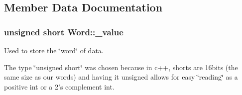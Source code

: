 \subsection{Member Data Documentation}
\hypertarget{classWord_a8b0aa1f2042266f307c51b3bdafa9128}{
\subsubsection[{\_\-value}]{\setlength{\rightskip}{0pt plus 5cm}unsigned short {\bf Word::\_\-value}}}
\label{classWord_a8b0aa1f2042266f307c51b3bdafa9128}


Used to store the \char`\"{}word\char`\"{} of data. 

The type \char`\"{}unsigned short\char`\"{} was chosen because in c++, shorts are 16bits (the same size as our words) and having it unsigned allows for easy \char`\"{}reading\char`\"{} as a positive int or a 2's complement int. 